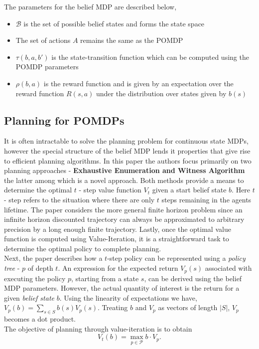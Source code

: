 \documentclass{article}
\begin{document}
The parameters for the belief MDP are described below,
\begin{itemize}
	\item $\mathcal{B}$ is the set of possible belief states and forms the state space
	\item The set of actions $A$ remains the same as the POMDP
	\item $\tau(b,a,b')$ is the state-transition function which can be computed using the POMDP parameters
	\item $\rho(b, a)$ is the reward function and is given by an expectation over the reward function $R(s, a)$ under the distribution over states given by $b(s)$
\end{itemize}

\subsection*{Planning for POMDPs}
It is often intractable to solve the planning problem for continuous state MDPs, however the special structure of the belief MDP lends it properties that give rise to efficient planning algorithms. In this paper the authors focus primarily on two planning approaches - \textbf{Exhaustive Enumeration and Witness Algorithm} the latter among which is a novel approach. Both methods provide a means to determine the optimal $t$ - step value function $V_t$ given a start belief state $b$. Here $t$ - step refers to the situation where there are only $t$ steps remaining in the agents lifetime. The paper considers the more general finite horizon problem since an infinite horizon discounted trajectory can always be approximated to arbitrary precision by a long enough finite trajectory. Lastly, once the optimal value function is computed using Value-Iteration, it is a straightforward task to determine the optimal policy to complete planning.\\
Next, the paper describes how a $t$-step policy can be represented using a \textit{policy tree} - $p$ of depth $t$. An expression for the expected return $V_p(s)$ associated with executing the policy $p$, starting from a state $s$, can be derived using the belief MDP parameters. However, the actual quantity of interest is the return for a given \textit{belief state} $b$. Using the linearity of expectations we have, $V_p(b) = \sum_{s \in S} b(s) V_p(s)$. Treating $b$ and $V_p$ as vectors of length $|S|$, $V_p$ becomes a dot product.\\
The objective of planning through value-iteration is to obtain 
$$V_t(b) = \max_{p \in \mathcal{P}} b \cdot V_p.$$
\end{document}
